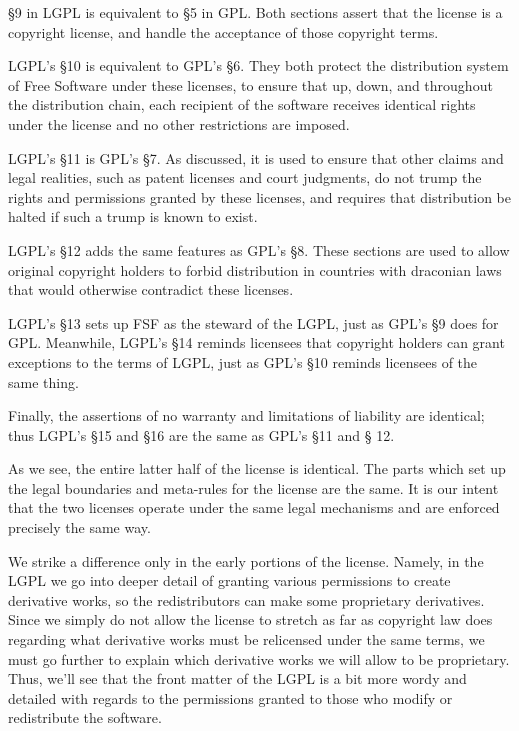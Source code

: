 \documentclass[11pt, letterpaper]{book}
\begin{document}
\S 9 in LGPL is equivalent to \S 5 in GPL\@. Both sections assert that
the license is a copyright license, and handle the acceptance of those
copyright terms.

LGPL's \S 10 is equivalent to GPL's \S 6. They both protect the
distribution system of Free Software under these licenses, to ensure that
up, down, and throughout the distribution chain, each recipient of the
software receives identical rights under the license and no other
restrictions are imposed.

LGPL's \S 11 is GPL's \S 7. As discussed, it is used to ensure that
other claims and legal realities, such as patent licenses and court
judgments, do not trump the rights and permissions granted by these
licenses, and requires that distribution be halted if such a trump is
known to exist.

LGPL's \S 12 adds the same features as GPL's \S 8. These sections are
used to allow original copyright holders to forbid distribution in
countries with draconian laws that would otherwise contradict these
licenses.

LGPL's \S 13 sets up FSF as the steward of the LGPL, just as GPL's \S 9
does for GPL. Meanwhile, LGPL's \S 14 reminds licensees that copyright
holders can grant exceptions to the terms of LGPL, just as GPL's \S 10
reminds licensees of the same thing.

Finally, the assertions of no warranty and limitations of liability are
identical; thus LGPL's \S 15 and \S 16 are the same as GPL's \S 11 and \S
12.

As we see, the entire latter half of the license is identical.
The parts which set up the legal boundaries and meta-rules for the license
are the same. It is our intent that the two licenses operate under the
same legal mechanisms and are enforced precisely the same way.

We strike a difference only in the early portions of the license.
Namely, in the LGPL we go into deeper detail of granting various permissions to
create derivative works, so the redistributors can make
some proprietary derivatives. Since we simply do not allow the
license to stretch as far as copyright law does regarding what
derivative works must be relicensed under the same terms, we must go
further to explain which derivative works we will allow to be
proprietary. Thus, we'll see that the front matter of the LGPL is a
bit more wordy and detailed with regards to the permissions granted to
those who modify or redistribute the software.
\end{document}
